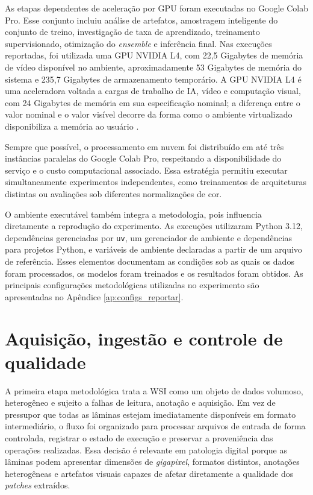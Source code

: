As etapas dependentes de aceleração por GPU foram executadas no Google Colab Pro. Esse conjunto incluiu análise de artefatos, amostragem inteligente do conjunto de treino, investigação de taxa de aprendizado, treinamento supervisionado, otimização do \textit{ensemble} e inferência final. Nas execuções reportadas, foi utilizada uma GPU NVIDIA L4, com 22{,}5 Gigabytes de memória de vídeo disponível no ambiente, aproximadamente 53 Gigabytes de memória  do sistema e 235{,}7 Gigabytes de armazenamento temporário. A GPU NVIDIA L4 é uma aceleradora voltada a cargas de trabalho de IA, vídeo e computação visual, com 24 Gigabytes de memória em sua especificação nominal; a diferença entre o valor nominal e o valor visível decorre da forma como o ambiente virtualizado disponibiliza a memória ao usuário \cite{nvidia_l4}. 

Sempre que possível, o processamento em nuvem foi distribuído em até três instâncias paralelas do Google Colab Pro, respeitando a disponibilidade do serviço e o custo computacional associado. Essa estratégia permitiu executar simultaneamente experimentos independentes, como treinamentos de arquiteturas distintas ou avaliações sob diferentes normalizações de cor.

O ambiente executável também integra a metodologia, pois influencia diretamente
a reprodução do experimento. As execuções utilizaram Python 3.12, dependências
gerenciadas por \texttt{uv}, um gerenciador de ambiente e dependências para
projetos Python, e variáveis de ambiente declaradas a partir de um arquivo de
referência. Esses elementos documentam as condições sob as quais os dados foram
processados, os modelos foram treinados e os resultados foram obtidos. As
principais configurações metodológicas utilizadas no experimento são apresentadas
no Apêndice \ref{ap:configs_reportar}.


\section{Aquisição, ingestão e controle de qualidade}\label{sec:met_ingestao_qc}

A primeira etapa metodológica trata a WSI como um objeto de dados volumoso,
heterogêneo e sujeito a falhas de leitura, anotação e aquisição. Em vez de
pressupor que todas as lâminas estejam imediatamente disponíveis em formato
intermediário, o fluxo foi organizado para processar arquivos de entrada de
forma controlada, registrar o estado de execução e preservar a proveniência das
operações realizadas. Essa decisão é relevante em patologia digital porque as
lâminas podem apresentar dimensões de \textit{gigapixel}, formatos distintos,
anotações heterogêneas e artefatos visuais capazes de afetar diretamente a
qualidade dos \textit{patches} extraídos.

